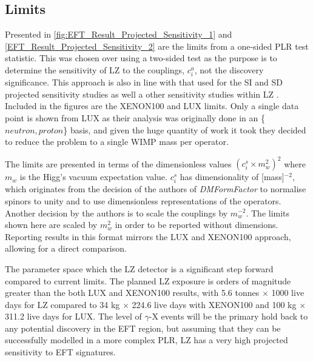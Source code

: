 \subsection{Limits}
\par
Presented in \autoref{fig:EFT_Result_Projected_Sensitivity_1} and \autoref{EFT_Result_Projected_Sensitivity_2} are the limits from a one-sided PLR test statistic.
This was chosen over using a two-sided test as the purpose is to determine the sensitivity of LZ to the couplings, $c^{a}_i$, not the discovery significance. 
This approach is also in line with that used for the SI and SD projected sensitivity studies \cite{LZ_projected_sensitivity_paper_ref} as well a other sensitivity studies within LZ \cite{LZ_Ibles_LZStats_Thesis_ref, umituktu_thesis_ref}.
Included in the figures are the XENON100 \cite{xenon100_eft_ref} and LUX \cite{LUX_RUN4_EFT_2021} limits.
Only a single data point is shown from LUX as their analysis was originally done in an \{$neutron,proton$\} basis, and given the huge quantity of work it took they decided to reduce the problem to a single WIMP mass per operator.
\par
The limits are presented in terms of the dimensionless values $({c}^{s}_{i}\times{m}^{2}_{w})^{2}$ where $m_w$ is the Higg's vacuum expectation value.
${c}^{s}_{i}$ has dimensionality of [mass]$^{-2}$, which originates from the decision of the authors of \textit{DMFormFactor} to normalise spinors to unity and to use dimensionless representations of the operators.
Another decision by the authors is to scale the couplings by $m^{-2}_w$.
The limits shown here are scaled by $m^2_w$ in order to be reported without dimensions.
Reporting results in this format mirrors the LUX and XENON100 approach, allowing for a direct comparison.
\par
The parameter space which the LZ detector is a significant step forward compared to current limits.
The planned LZ exposure is orders of magnitude greater than the both LUX and XENON100 results, with 5.6 tonnes $\times$ 1000 live days for LZ compared to 34 kg $\times$ 224.6 live days with XENON100 and 100 kg $\times$ 311.2 live days for LUX.
The level of $\gamma$-X events will be the primary hold back to any potential discovery in the EFT region, but assuming that they can be successfully modelled in a more complex PLR, LZ has a very high projected sensitivity to EFT signatures.


